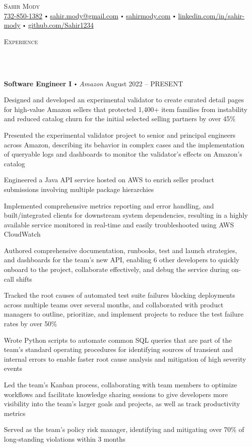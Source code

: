 \documentclass{article}
\newcommand{\contact}[3]{
\vspace*{3pt}
\begin{center}
{\Huge \scshape {#1}}\\
\vspace{0pt}
#2 
\vspace{0pt}
#3
\end{center}
\vspace*{-3pt}
}
\newcommand{\header}[1]{{
\hspace*{-15pt}\vspace*{10pt} \large \scshape{#1}} \vspace*{-6pt} 
\lineunder
}
\newcommand{\lineunder}{
\vspace*{-8pt} \\ \hspace*{-18pt} 
\hrulefill \\
}
\newcommand{\employer}[4]{
\textbf{#1} \labelitemi \textit{#2} \hfill #3 \\ #4 \vspace*{3pt}
}
\renewcommand{\labelitemi}{
$\vcenter{\hbox{\tiny$\bullet$}}$\hspace*{3pt}
}
\renewcommand{\labelitemii}{
$\vcenter{\hbox{\tiny$\bullet$}}$\hspace*{-3pt}
}
\newenvironment{bullet-list-minor}{
\begin{list}{\labelitemii}{\setlength\leftmargin{15pt} 
\topsep 0pt \itemsep 1pt}}{\vspace*{4pt}\end{list}
}
\begin{document}
\small
\vspace*{-64pt}

\contact{Sahir Mody}\bigskip
{\href{tel:7328501382}{732-850-1382}\labelitemi\href{mailto:sahir.mody@gmail.com}{sahir.mody@gmail.com}\labelitemi\href{https://sahirmody.com}{sahirmody.com}\labelitemi\href{https://www.linkedin.com/in/sahir-mody}{linkedin.com/in/sahir-mody}  \labelitemi\href{https://www.github.com/Sahir1234}{github.com/Sahir1234}}
\medskip
\header{Experience}
    \vspace{4pt}
    \employer{Software Engineer I}{Amazon}{August 2022 -- PRESENT}{}
	\begin{bullet-list-minor}
        \item Designed and developed an experimental validator to create curated detail pages for high-value Amazon sellers that protected 1,400+ item families from instability and reduced catalog churn for the initial selected selling partners by over 45\%
        \item Presented the experimental validator project to senior and principal engineers across Amazon, describing its behavior in complex cases and the implementation of queryable logs and dashboards to monitor the validator's effects on Amazon's catalog
        \item Engineered a Java API service hosted on AWS to enrich seller product submissions involving multiple package hierarchies
        \item Implemented comprehensive metrics reporting and error handling, and built/integrated clients for downstream system dependencies, resulting in a highly available service monitored in real-time and easily troubleshooted using AWS CloudWatch
        \item Authored comprehensive documentation, runbooks, test and launch strategies, and dashboards for the team's new API, enabling 6 other developers to quickly onboard to the project, collaborate effectively, and debug the service during on-call shifts
        \item Tracked the root causes of automated test suite failures blocking deployments across multiple teams over several months, and collaborated with product managers to outline, prioritize, and implement projects to reduce the test failure rates by over 50\%
        \item Wrote Python scripts to automate common SQL queries that are part of the team's standard operating procedures for identifying sources of transient and internal errors to enable faster root cause analysis and mitigation of high severity events
        \item Led the team's Kanban process, collaborating with team members to optimize workflows and facilitate knowledge sharing sessions to give developers more visibility into the team's larger goals and projects, as well as track productivity metrics 
        \item Served as the team's policy risk manager, identifying and mitigating over 70\% of long-standing violations within 3 months
    \end{bullet-list-minor}
    \medskip
    
\end{document}

